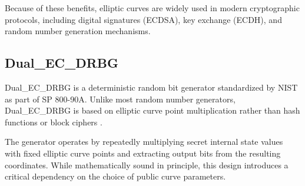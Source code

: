 \documentclass[12pt,letterpaper]{article}
\begin{document}
Because of these benefits, elliptic curves are widely used in modern cryptographic protocols, including digital signatures (ECDSA), key exchange (ECDH), and random number generation mechanisms.

\subsection{Dual\_EC\_DRBG}

Dual\_EC\_DRBG is a deterministic random bit generator standardized by NIST as part of SP 800-90A. Unlike most random number generators, Dual\_EC\_DRBG is based on elliptic curve point multiplication rather than hash functions or block ciphers \cite{nist2015sp80090a}.

The generator operates by repeatedly multiplying secret internal state values with fixed elliptic curve points and extracting output bits from the resulting coordinates. While mathematically sound in principle, this design introduces a critical dependency on the choice of public curve parameters.

\vspace{0.45cm}
\end{document}

